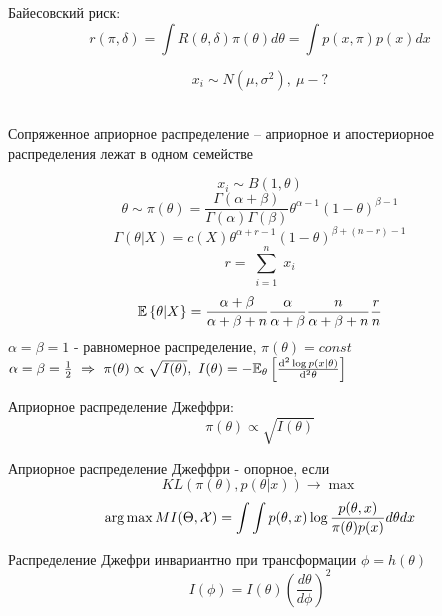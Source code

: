 \begin{definition}
	Байесовский риск: $$ r(\pi, \delta) = \int R(\theta, \delta) \pi(\theta) d\theta = \int p(x, \pi) p(x)dx $$
\end{definition}

\begin{example}
	$$ x_i \sim N(\mu, \sigma^2), \ \mu - ? $$	\\
\end{example}

\begin{definition}
	Сопряженное априорное распределение – априорное и апостериорное распределения лежат в одном семействе
\end{definition}

\begin{example}
	$$ x_i \sim B(1, \theta)$$ $$ \theta \sim \pi(\theta) = \frac{\Gamma(\alpha+\beta)}{\Gamma(\alpha)\Gamma(\beta)}\theta^{\alpha-1}(1-\theta)^{\beta-1} $$
	$$ \Gamma(\theta|X) = c(X) \theta^{\alpha+r-1}(1-\theta)^{\beta + (n-r) - 1} $$
	$$ r = \sum_{\substack{i=1}}^n x_i$$
	$$ \mathbb{E}\left\{ \theta|X \right\} = \frac{\alpha+\beta}{\alpha+\beta+n} \frac{\alpha}{\alpha+\beta} \frac{n}{\alpha+\beta+n} \frac{r}{n} $$
	$\alpha=\beta=1$ - равномерное распределение, $\pi(\theta)=const$ \\
	$\alpha=\beta=\frac{1}{2} \ \Rightarrow \ \pi(\theta) \propto \sqrt{I(\theta)}, \ I(\theta) = -\set{E}_{\theta}\squarebraces{\frac{{\mathrm d}^2 \log p(x|\theta)}{{\mathrm d}^2 \theta}} $
\end{example}

\begin{definition}
	Априорное распределение Джеффри: $$ \pi(\theta) \propto \sqrt{I(\theta)} $$
\end{definition}

\begin{definition}
	Априорное распределение Джеффри - опорное, если $$ KL(\pi(\theta), p(\theta|x)) \to \max $$
	$$ \arg \max MI(\Theta, \mathcal{X}) = \int \int p(\theta, x) \log \frac{p(\theta, x)}{\pi(\theta) p(x)} d\theta dx $$
\end{definition}

\begin{statement}
	Распределение Джефри инвариантно при трансформации $ \phi=h(\theta)$
	$$ I(\phi) = I(\theta) (\frac{d\theta}{d\phi})^2$$
\end{statement}